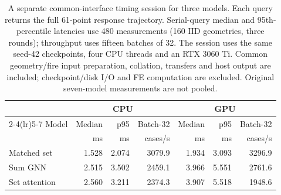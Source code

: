 \begin{table}[t]
\centering
\small
\caption{A separate common-interface timing session for three models. Each query returns the full 61-point response trajectory. Serial-query median and 95th-percentile latencies use 480 measurements (160 IID geometries, three rounds); throughput uses fifteen batches of 32. The session uses the same seed-42 checkpoints, four CPU threads and an RTX 3060 Ti. Common geometry/fire input preparation, collation, transfers and host output are included; checkpoint/disk I/O and FE computation are excluded. Original seven-model measurements are not pooled.}
\label{tab:attention_timing}
\begin{tabular}{lrrrrrr}
\toprule
 & \multicolumn{3}{c}{CPU} & \multicolumn{3}{c}{GPU} \\
\cmidrule(lr){2-4}\cmidrule(lr){5-7}
Model & Median & p95 & Batch-32 & Median & p95 & Batch-32 \\
 & ms & ms & cases/s & ms & ms & cases/s \\
\midrule
Matched set & 1.528 & 2.074 & 3079.9 & 1.934 & 3.093 & 3296.9 \\
Sum GNN & 2.515 & 3.502 & 2459.1 & 3.966 & 5.551 & 2761.6 \\
Set attention & 2.560 & 3.211 & 2374.3 & 3.907 & 5.518 & 1948.6 \\
\bottomrule
\end{tabular}
\end{table}
